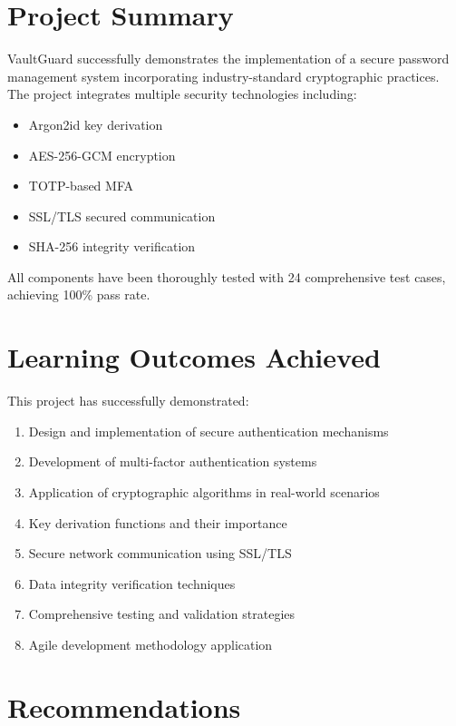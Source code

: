 \documentclass[12pt,a4paper]{report}
\begin{document}
\section{Project Summary}

VaultGuard successfully demonstrates the implementation of a secure password management system incorporating industry-standard cryptographic practices. The project integrates multiple security technologies including:

\begin{itemize}
    \item Argon2id key derivation
    \item AES-256-GCM encryption
    \item TOTP-based MFA
    \item SSL/TLS secured communication
    \item SHA-256 integrity verification
\end{itemize}

All components have been thoroughly tested with 24 comprehensive test cases, achieving 100\% pass rate.

\section{Learning Outcomes Achieved}

This project has successfully demonstrated:

\begin{enumerate}
    \item Design and implementation of secure authentication mechanisms
    \item Development of multi-factor authentication systems
    \item Application of cryptographic algorithms in real-world scenarios
    \item Key derivation functions and their importance
    \item Secure network communication using SSL/TLS
    \item Data integrity verification techniques
    \item Comprehensive testing and validation strategies
    \item Agile development methodology application
\end{enumerate}

\section{Recommendations}
\end{document}
